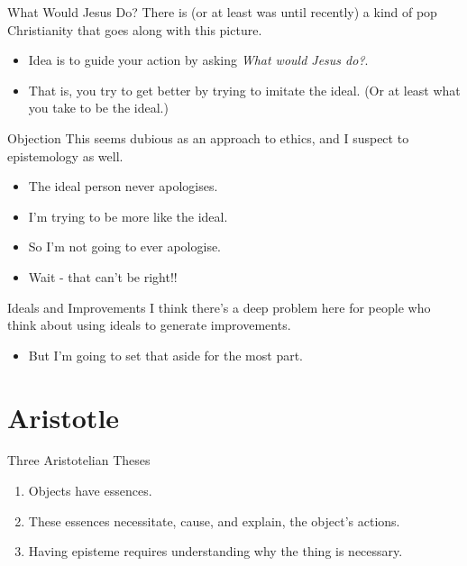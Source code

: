 \documentclass[
  17pt,
  letterpaper,
  ignorenonframetext,
  aspectratio=169,
]{beamer}
\providecommand{\tightlist}{%
  \setlength{\itemsep}{0pt}\setlength{\parskip}{0pt}}\usepackage{longtable,booktabs,array}
\begin{document}
\begin{frame}{What Would Jesus Do?}
\protect\hypertarget{what-would-jesus-do}{}
There is (or at least was until recently) a kind of pop Christianity
that goes along with this picture.

\begin{itemize}[<+->]
\tightlist
\item
  Idea is to guide your action by asking \emph{What would Jesus do?}.
\item
  That is, you try to get better by trying to imitate the ideal. (Or at
  least what you take to be the ideal.)
\end{itemize}
\end{frame}

\begin{frame}{Objection}
\protect\hypertarget{objection}{}
This seems dubious as an approach to ethics, and I suspect to
epistemology as well.

\begin{itemize}[<+->]
\tightlist
\item
  The ideal person never apologises.
\item
  I'm trying to be more like the ideal.
\item
  So I'm not going to ever apologise.
\item
  Wait - that can't be right!!
\end{itemize}
\end{frame}

\begin{frame}{Ideals and Improvements}
\protect\hypertarget{ideals-and-improvements-1}{}
I think there's a deep problem here for people who think about using
ideals to generate improvements.

\begin{itemize}[<+->]
\tightlist
\item
  But I'm going to set that aside for the most part.
\end{itemize}
\end{frame}

\hypertarget{aristotle}{%
\section{Aristotle}\label{aristotle}}

\begin{frame}{Three Aristotelian Theses}
\protect\hypertarget{three-aristotelian-theses}{}
\begin{enumerate}[<+->]
\tightlist
\item
  Objects have essences.
\item
  These essences necessitate, cause, and explain, the object's actions.
\item
  Having episteme requires understanding why the thing is necessary.
\end{enumerate}
\end{frame}
\end{document}
